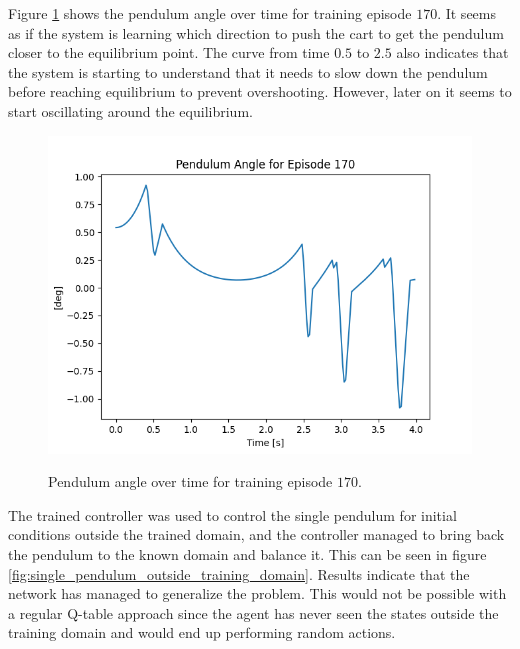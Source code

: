 \documentclass{LTHtwocol} %
\begin{document}
Figure \ref{fig:single_pendulum_angle} shows the pendulum angle over time for training episode $170$.
It seems as if the system is learning which direction to push the cart to get the pendulum closer to the equilibrium point.
The curve from time $0.5$ to $2.5$ also indicates that the system is starting to understand that it needs to slow down the pendulum before reaching equilibrium to prevent overshooting.
However, later on it seems to start oscillating around the equilibrium.

\begin{figure}[H]
	\centering
	\includegraphics[width=0.9\columnwidth]{figures/Pendulum_angle.png}
	\label{fig:single_pendulum_angle}
	\caption{Pendulum angle over time for training episode $170$.}
\end{figure}

The trained controller was used to control the single pendulum for initial conditions outside the trained domain, and the controller managed to bring back the pendulum to the known domain and balance it.
This can be seen in figure \ref{fig:single_pendulum_outside_training_domain}.
Results indicate that the network has managed to generalize the problem.
This would not be possible with a regular Q-table approach since the agent has never seen the states outside the training domain and would end up performing random actions.
\end{document}
